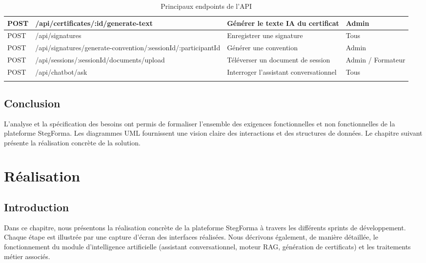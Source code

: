 \documentclass[12pt,a4paper]{report}
\begin{document}
\begin{longtable}{|l|l|p{5.4cm}|p{2.2cm}|}
\hline
POST & /api/certificates/:id/generate-text & Générer le texte IA du certificat & Admin \\
\hline
POST & /api/signatures & Enregistrer une signature & Tous \\
\hline
POST & /api/signatures/generate-convention/:sessionId/:participantId & Générer une convention & Admin \\
\hline
POST & /api/sessions/:sessionId/documents/upload & Téléverser un document de session & Admin / Formateur \\
\hline
POST & /api/chatbot/ask & Interroger l'assistant conversationnel & Tous \\
\hline
\caption{Principaux endpoints de l'API}
\label{tab:api}
\end{longtable}

\enlargethispage{2cm}

\section*{Conclusion}
\hrulefill

L'analyse et la spécification des besoins ont permis de formaliser l'ensemble des exigences fonctionnelles et non fonctionnelles de la plateforme StegForma. Les diagrammes UML fournissent une vision claire des interactions et des structures de données. Le chapitre suivant présente la réalisation concrète de la solution.

\chapter{Réalisation}

\section*{Introduction}

Dans ce chapitre, nous présentons la réalisation concrète de la plateforme StegForma à travers les différents sprints de développement. Chaque étape est illustrée par une capture d'écran des interfaces réalisées. Nous décrivons également, de manière détaillée, le fonctionnement du module d'intelligence artificielle (assistant conversationnel, moteur RAG, génération de certificats) et les traitements métier associés.
\end{document}
